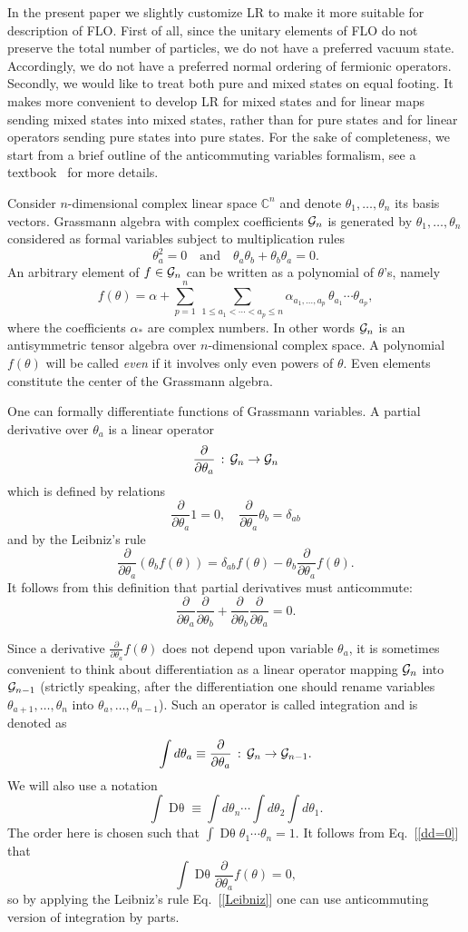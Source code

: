 \documentclass[twocolumn,showpacs,preprintnumbers,superscriptaddress]{revtex4}
\newcommand{\CC}{\mathbb{C}}
\newcommand{\Gr}{{\cal G}}
\newcommand{\drv}[1]{\frac{\partial}{\partial{#1}}}
\newcommand{\D}[1]{\mathop{\mathrm{D}#1}}
\newcommand{\be}{\begin{equation}}
\newcommand{\ee}{\end{equation}}
\begin{document}
In the present paper we slightly customize LR to make it more suitable for
description of FLO. 
First of all, since the unitary elements of FLO
do not preserve the total number of particles, we do not have a preferred vacuum state.
Accordingly, we do not have a preferred normal ordering of fermionic operators.
Secondly, we would like to treat both pure and mixed states on equal footing.
It makes more convenient to develop LR for mixed states and for linear maps
sending mixed states into mixed states, rather than for pure states and
for linear operators sending pure states into pure states.
For the sake of completeness, we start from a brief outline
of the anticommuting variables formalism, see a textbook~\cite{DiFrancesco}
for more details.


Consider $n$-dimensional complex linear space $\CC^{n}$ and denote 
$\theta_1,\ldots,\theta_{n}$ its basis vectors.
Grassmann algebra with complex coefficients $\Gr_{n}$ is 
generated by $\theta_1,\ldots, \theta_{n}$ considered as 
formal variables  subject to multiplication rules
\be\label{Grassman}
\theta_a^2=0 \quad \mbox{and} \quad \theta_a\theta_b + \theta_b\theta_a =0.
\ee
An arbitrary element of $f\in \Gr_{n}$ can be written as a polynomial
of $\theta$'s, namely
\[
f(\theta)=\alpha +\sum_{p=1}^{n}\,
\sum_{1\le a_1<\cdots <a_p\le n}
\alpha_{a_1,\ldots,a_p}\, \theta_{a_1}\cdots \theta_{a_p},
\]
where the coefficients $\alpha_{*}$ are complex numbers.
In other words $\Gr_{n}$ is an antisymmetric tensor algebra over $n$-dimensional
complex space.
A polynomial $f(\theta)$ will be called {\it even} if it involves
only even powers of  $\theta$. Even elements constitute the center
of the Grassmann algebra.

One can formally differentiate functions of Grassmann variables. A partial
derivative over $\theta_a$ is a linear operator 
\[
\drv{\theta_a} \, : \, \Gr_{n} \to \Gr_{n}
\]
which is defined by relations
\[
\drv{\theta_a} 1 =0, \quad \drv{\theta_a}\theta_b =\delta_{ab}
\]
and by the Leibniz's rule
\be\label{Leibniz}
\drv{\theta_a} \left( \theta_b f(\theta)\right) =
\delta_{ab} f(\theta) -\theta_b\drv{\theta_a}f(\theta).
\ee
It follows from this definition that partial derivatives must anticommute:
\be\label{dd=0}
\drv{\theta_a}\drv{\theta_b} + \drv{\theta_b}\drv{\theta_a}=0.
\ee

Since a derivative $\drv{\theta_a} f(\theta)$ does not depend upon variable
$\theta_a$, it is sometimes convenient to think about differentiation as
a linear operator mapping $\Gr_{n}$ into $\Gr_{n-1}$ (strictly speaking, 
after the differentiation one should rename variables $\theta_{a+1},
\ldots,\theta_{n}$ into $\theta_{a},\ldots,\theta_{n-1}$). 
Such an operator is called integration and is denoted as
\[
\int d{\theta_a} \equiv \drv{\theta_a} \, : \, \Gr_{n}\to \Gr_{n-1}.
\]
We will also use a notation 
\[
\int \D{\theta} \equiv \int d\theta_{n} \cdots \int d\theta_2 \int d\theta_1.
\]
The order here is chosen such that $\int\D{\theta}\theta_1\cdots\theta_n=1$.
It follows from Eq.~[\ref{dd=0}] that
\[
\int \D{\theta} \drv{\theta_a} f(\theta) =0,
\]
so by applying the Leibniz's rule Eq.~[\ref{Leibniz}] one can use
anticommuting version of integration by parts.
\end{document}
